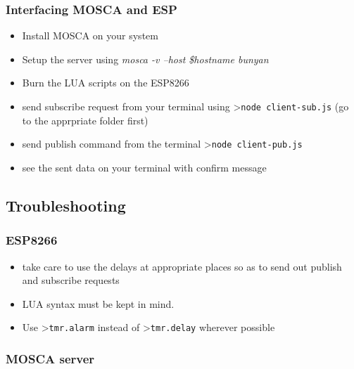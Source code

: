 \documentclass[16pt]{article}
\begin{document}
\vspace{0.5cm}

\subsubsection{Interfacing MOSCA and ESP}

\begin{itemize}

\item
  Install MOSCA on your system
\item
  Setup the server using \emph{mosca -v --host \$hostname \textbar{}
  bunyan}
\item
  Burn the LUA scripts on the ESP8266
\item


  send subscribe request from your terminal using
  \textgreater{}\texttt{node client-sub.js} (go to the apprpriate folder
  first)
\item
  send publish command from the terminal
  \textgreater{}\texttt{node client-pub.js}
\item
  see the sent data on your terminal with confirm message
\end{itemize}



\subsection{Troubleshooting}


\subsubsection{ESP8266}

\begin{itemize}

\item
  take care to use the delays at appropriate places so as to send out
  publish and subscribe requests
\item
  LUA syntax must be kept in mind.
\item
  Use \textgreater{}\texttt{tmr.alarm} instead of
  \textgreater{}\texttt{tmr.delay} wherever possible
\end{itemize}

\vspace{0.6cm}

\subsubsection{MOSCA server}
\end{document}
